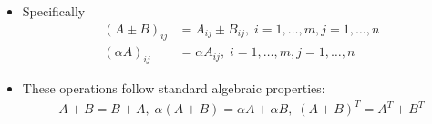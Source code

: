 \begin{frame}{}
\begin{itemize}
    \item Specifically 
    \begin{align*}
        (A \pm B) _{ij} &= A_{ij} \pm B_{ij}, \; i = 1, \ldots, m, j = 1, \ldots, n\\
        (\alpha A)_{ij} &= \alpha A_{ij},  \; i = 1, \ldots, m, j = 1, \ldots, n
    \end{align*}
    \item These operations follow standard algebraic properties:
    \begin{align}
        A+ B = B + A, \; \alpha(A+ B) = \alpha A + \alpha B, \; (A + B ) ^T = A ^T + B^T
    \end{align}
    
\end{itemize}
\end{frame}
